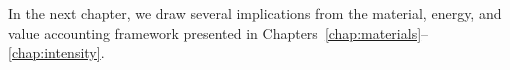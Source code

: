 In the next chapter, we draw several implications 
from the material, energy, and value accounting framework presented in
Chapters~\ref{chap:materials}--\ref{chap:intensity}.








%
%




